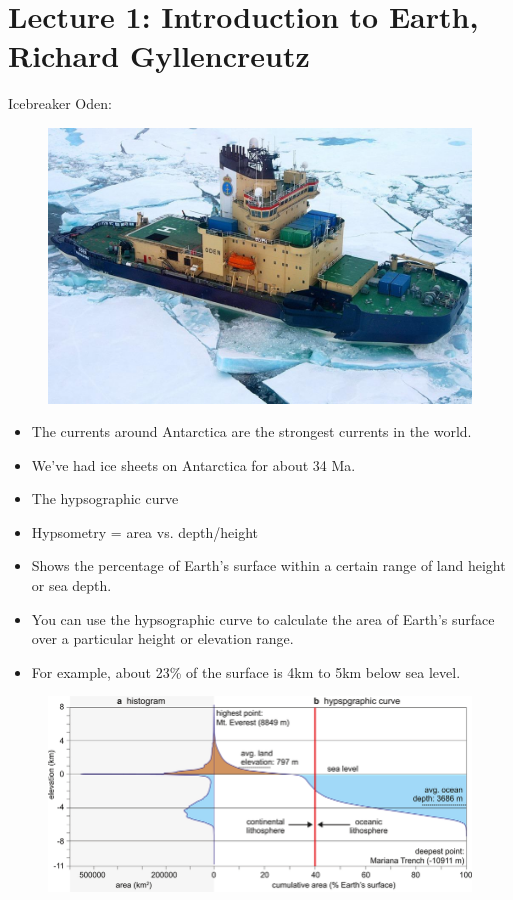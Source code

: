 
\section{Lecture 1: Introduction to Earth, Richard Gyllencreutz}

Icebreaker Oden:

\begin{figure}[H]
    \centering
    \includegraphics[width=0.9\linewidth]{img/odeb.png}
\end{figure}

\begin{itemize}
    \item The currents around Antarctica are the strongest currents in the
        world.
    \item We've had ice sheets on Antarctica for about 34 Ma.
    \item The hypsographic curve
    \item Hypsometry = area vs. depth/height
    \item Shows the percentage of Earth's surface within a certain range of
        land height or sea depth.
    \item You can use the hypsographic curve to calculate the area of Earth's
        surface over a particular height or elevation range.
    \item For example, about 23\% of the surface is 4km to 5km below sea
        level.
\end{itemize}

\begin{figure}[H]
    \centering
    \includegraphics[width=0.9\linewidth]{img/hypsographic_curve.png}
\end{figure}


